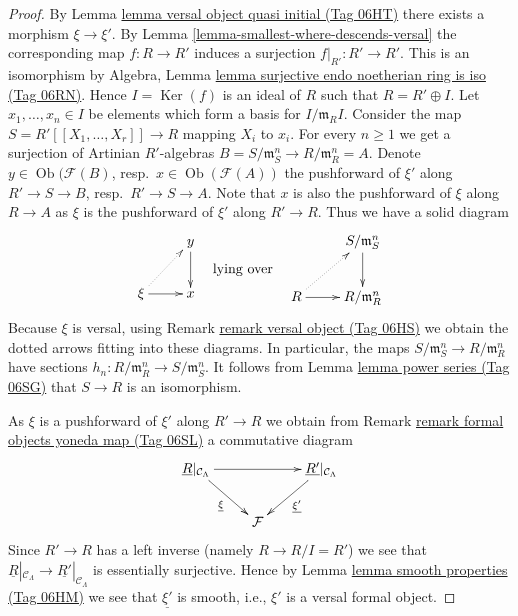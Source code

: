 \documentclass{amsart}
\theoremstyle{plain}
\theoremstyle{definition}
\theoremstyle{remark}
\numberwithin{equation}{subsection}
\def\Ob{\mathop{\mathrm{Ob}}\nolimits}
\def\Ker{\mathop{\mathrm{Ker}}}
\begin{document}
\begin{proof}
By
Lemma \href{https://stacks.math.columbia.edu/tag/06HT}{lemma versal object quasi initial (Tag 06HT)}
there exists a morphism $\xi \to \xi'$. By
Lemma \ref{lemma-smallest-where-descends-versal}
the corresponding map $f : R \to R'$ induces a surjection
$f|_{R'} : R' \to R'$. This is an isomorphism by
Algebra, Lemma \href{https://stacks.math.columbia.edu/tag/06RN}{lemma surjective endo noetherian ring is iso (Tag 06RN)}.
Hence $I = \Ker(f)$ is an ideal of $R$ such that $R = R' \oplus I$.
Let $x_1, \ldots, x_n \in I$ be elements which form a basis for
$I/\mathfrak m_RI$. Consider the map
$S = R'[[X_1, \ldots, X_r]] \to R$ mapping $X_i$ to $x_i$.
For every $n \geq 1$ we get a surjection of Artinian $R'$-algebras
$B = S/\mathfrak m_S^n \to R/\mathfrak m_R^n = A$. Denote
$y \in \Ob(\mathcal{F}(B)$, resp.\ $x \in \Ob(\mathcal{F}(A))$
the pushforward of $\xi'$ along $R' \to S \to B$, resp.\ $R' \to S \to A$.
Note that $x$ is also the pushforward of $\xi$ along $R \to A$ as
$\xi$ is the pushforward of $\xi'$ along $R' \to R$.
Thus we have a solid diagram
$$
\vcenter{
\xymatrix{
& y \ar[d] \\
\xi \ar[r] \ar@{..>}[ru] & x
}
}
\quad\text{lying over}\quad
\vcenter{
\xymatrix{
& S/\mathfrak m_S^n \ar[d] \\
R \ar[r] \ar@{..>}[ru] & R/\mathfrak m_R^n
}
}
$$
Because $\xi$ is versal, using
Remark \href{https://stacks.math.columbia.edu/tag/06HS}{remark versal object (Tag 06HS)}
we obtain the dotted arrows fitting into these diagrams.
In particular, the maps $S/\mathfrak m_S^n \to R/\mathfrak m_R^n$
have sections $h_n : R/\mathfrak m_R^n \to S/\mathfrak m_S^n$.
It follows from
Lemma \href{https://stacks.math.columbia.edu/tag/06SG}{lemma power series (Tag 06SG)}
that $S \to R$ is an isomorphism.

\medskip\noindent
As $\xi$ is a pushforward of $\xi'$ along $R' \to R$ we obtain from
Remark \href{https://stacks.math.columbia.edu/tag/06SL}{remark formal objects yoneda map (Tag 06SL)}
a commutative diagram
$$
\xymatrix{
\underline{R}|_{\mathcal{C}_\Lambda} \ar[rr] \ar[rd]_{\underline{\xi}} & &
\underline{R'}|_{\mathcal{C}_\Lambda} \ar[ld]^{\underline{\xi'}} \\
& \mathcal{F}
}
$$
Since $R' \to R$ has a left inverse (namely $R \to R/I = R'$) we see that
$\underline{R}|_{\mathcal{C}_\Lambda} \to
\underline{R'}|_{\mathcal{C}_\Lambda}$ is essentially surjective.
Hence by
Lemma \href{https://stacks.math.columbia.edu/tag/06HM}{lemma smooth properties (Tag 06HM)}
we see that $\underline{\xi'}$ is smooth, i.e., $\xi'$ is a versal
formal object.
\end{proof}
\end{document}
